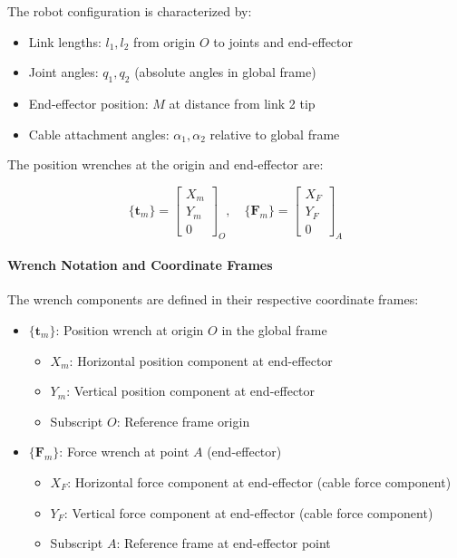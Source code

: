 The robot configuration is characterized by:
\begin{itemize}
    \item Link lengths: $l_1, l_2$ from origin $O$ to joints and end-effector
    \item Joint angles: $q_1, q_2$ (absolute angles in global frame)
    \item End-effector position: $M$ at distance from link 2 tip
    \item Cable attachment angles: $\alpha_1, \alpha_2$ relative to global frame
\end{itemize}

The position wrenches at the origin and end-effector are:

\begin{equation}
\{\mathbf{t}_m\} = \begin{bmatrix} X_m \\ Y_m \\ 0 \end{bmatrix}_O, \quad \{\mathbf{F}_m\} = \begin{bmatrix} X_F \\ Y_F \\ 0 \end{bmatrix}_A
\end{equation}

\paragraph{Wrench Notation and Coordinate Frames}

The wrench components are defined in their respective coordinate frames:

\begin{itemize}
    \item $\{\mathbf{t}_m\}$: Position wrench at origin $O$ in the global frame
    \begin{itemize}
        \item $X_m$: Horizontal position component at end-effector
        \item $Y_m$: Vertical position component at end-effector
        \item Subscript $O$: Reference frame origin
    \end{itemize}
    
    \item $\{\mathbf{F}_m\}$: Force wrench at point $A$ (end-effector)
    \begin{itemize}
        \item $X_F$: Horizontal force component at end-effector (cable force component)
        \item $Y_F$: Vertical force component at end-effector (cable force component)
        \item Subscript $A$: Reference frame at end-effector point
    \end{itemize}
\end{itemize}

